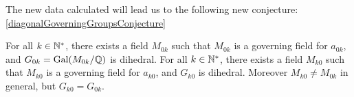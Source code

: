 The new data calculated will lead us to the following new conjecture:
\ref{diagonalGoverningGroupsConjecture}
\begin{conjecture}
	For all $k \in \mathbb{N}^*$, there exists a field $M_{0k}$ such that $M_{0k}$ is a governing field for $a_{0k}$, and $G_{0k} = \text{Gal}(M_{0k}/\mathbb{Q})$ is dihedral.
	For all $k \in \mathbb{N}^*$, there exists a field $M_{k0}$ such that $M_{k0}$ is a governing field for $a_{k0}$, and $G_{k0}$ is dihedral.
	Moreover $M_{k0} \neq M_{0k}$ in general, but $G_{k0} = G_{0k}$.
\end{conjecture}
